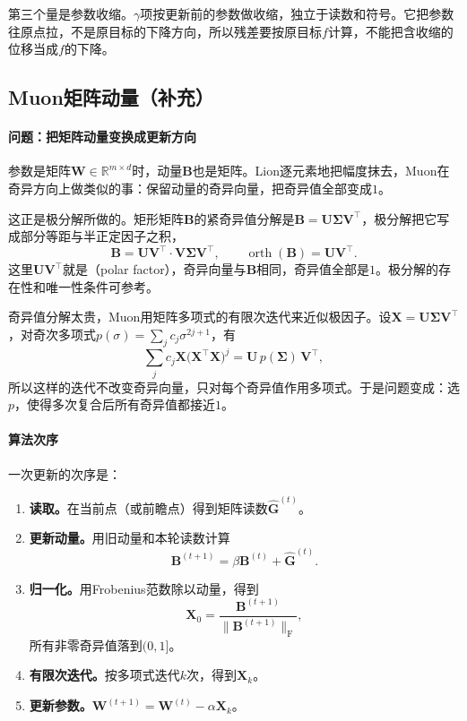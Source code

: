 第三个量是参数收缩。$\gamma$项按更新前的参数做收缩，独立于读数和符号。它把参数往原点拉，不是原目标的下降方向，所以残差要按原目标$f$计算，不能把含收缩的位移当成$f$的下降。

\subsection{Muon矩阵动量（补充）}
\label{sec:sgdb-muon}

\paragraph{问题：把矩阵动量变换成更新方向}
参数是矩阵$\bm{W}\in\mathbb{R}^{m\times d}$时，动量$\bm{B}$也是矩阵。Lion逐元素地把幅度抹去，Muon在奇异方向上做类似的事：保留动量的奇异向量，把奇异值全部变成$1$。

这正是极分解所做的。矩形矩阵$\bm{B}$的紧奇异值分解是$\bm{B}=\bm{U}\bm{\Sigma}\bm{V}^\top$，极分解把它写成部分等距与半正定因子之积，
\begin{equation}
 \bm{B}=\bm{U}\bm{V}^\top\cdot\bm{V}\bm{\Sigma}\bm{V}^\top,\qquad
 \operatorname{orth}(\bm{B})=\bm{U}\bm{V}^\top .
 \label{eq:sgdb-polar}
\end{equation}
这里$\bm{U}\bm{V}^\top$就是（polar factor），奇异向量与$\bm{B}$相同，奇异值全部是$1$。极分解的存在性和唯一性条件可参考。

奇异值分解太贵，Muon用矩阵多项式的有限次迭代来近似极因子。设$\bm{X}=\bm{U}\bm{\Sigma}\bm{V}^\top$，对奇次多项式$p(\sigma)=\sum_jc_j\sigma^{2j+1}$，有
\begin{equation}
 \sum_jc_j\bm{X}\bigl(\bm{X}^\top\bm{X}\bigr)^j=\bm{U}\,p(\bm{\Sigma})\,\bm{V}^\top ,
 \label{eq:sgdb-odd-poly}
\end{equation}
所以这样的迭代不改变奇异向量，只对每个奇异值作用多项式。于是问题变成：选$p$，使得多次复合后所有奇异值都接近$1$。

\paragraph{算法次序}
一次更新的次序是：
\begin{enumerate}
 \item \textbf{读取。}在当前点（或前瞻点）得到矩阵读数$\hat{\bm G}^{(t)}$。
 \item \textbf{更新动量。}用旧动量和本轮读数计算
 \begin{equation}
  \bm{B}^{(t+1)}=\beta\bm{B}^{(t)}+\hat{\bm G}^{(t)}.
  \label{eq:sgdb-muon-momentum}
 \end{equation}
 \item \textbf{归一化。}用Frobenius范数除以动量，得到
 \[
  \bm{X}_0=\frac{\bm{B}^{(t+1)}}{\lVert\bm{B}^{(t+1)}\rVert_{\mathrm{F}}},
 \]
 所有非零奇异值落到$(0,1]$。
 \item \textbf{有限次迭代。}按多项式迭代$k$次，得到$\bm{X}_k$。
 \item \textbf{更新参数。}$\bm{W}^{(t+1)}=\bm{W}^{(t)}-\alpha\bm{X}_k$。
\end{enumerate}

